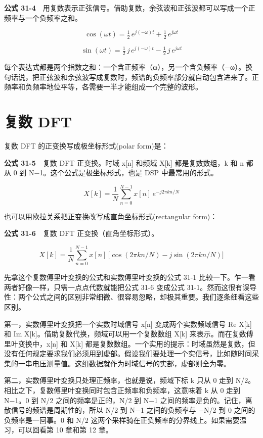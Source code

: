 \textbf{公式
31-4}　用复数表示正弦信号。借助复数，余弦波和正弦波都可以写成一个正频率与一个负频率之和。

\[\cos(\omega t) = \tfrac{1}{2}\,e^{j(-\omega)t} + \tfrac{1}{2}\,e^{j\omega t}\]

\[\sin(\omega t) = \tfrac{1}{2}\,j\,e^{j(-\omega)t} - \tfrac{1}{2}\,j\,e^{j\omega t}\]

每个表达式都是两个指数之和：一个含正频率（ω），另一个含负频率（−ω）。换句话说，把正弦波和余弦波写成复数时，频谱的负频率部分就自动包含进来了。正频率和负频率地位平等，各需要一半才能组成一个完整的波形。

\section{复数 DFT}

复数 DFT 的正变换写成极坐标形式(polar form)是：

\textbf{公式 31-5}　复数 DFT 正变换。时域 x{[}n{]} 和频域 X{[}k{]}
都是复数数组，k 和 n 都从 0 到 N−1。这个公式是极坐标形式，也是 DSP
中最常用的形式。

\[X[k] = \frac{1}{N}\sum_{n=0}^{N-1} x[n]\,e^{-j2\pi kn/N}\]

也可以用欧拉关系把正变换改写成直角坐标形式(rectangular form)：

\textbf{公式 31-6}　复数 DFT 正变换（直角坐标形式）。

\[X[k] = \frac{1}{N}\sum_{n=0}^{N-1} x[n]\,\big[\cos(2\pi kn/N) - j\sin(2\pi kn/N)\big]\]

先拿这个复数傅里叶变换的公式和实数傅里叶变换的公式 31-1
比较一下。乍一看两者好像一样，只需一点点代数就能把公式 31-6 变成公式
31-1。然而这很有误导性：两个公式之间的区别非常细微、很容易忽略，却极其重要。我们逐条细看这些区别。

第一，实数傅里叶变换把一个实数时域信号 x{[}n{]} 变成两个实数频域信号 Re
X{[}k{]} 和 Im X{[}k{]}。借助复数代换，频域可以用一个复数数组 X{[}k{]}
来表示。而在复数傅里叶变换中，x{[}n{]} 和 X{[}k{]}
都是复数数组。一个实用的提示：时域虽然是复数，但没有任何规定要求我们必须用到虚部。假设我们要处理一个实信号，比如随时间采集的一串电压测量值。这组数据就作为时域信号的实部，虚部则全为零。

第二，实数傅里叶变换只处理正频率，也就是说，频域下标 k 只从 0 走到
N/2。相比之下，复数傅里叶变换同时包含正频率和负频率，这意味着 k 从 0
走到 N−1。0 到 N/2 之间的频率是正的，N/2 到 N−1
之间的频率是负的。记住，离散信号的频谱是周期性的，所以 N/2 到 N−1
之间的负频率与 −N/2 到 0 之间的负频率是一回事。0 和 N/2
这两个采样骑在正负频率的分界线上。如果需要温习，可以回看第 10 章和第 12
章。

